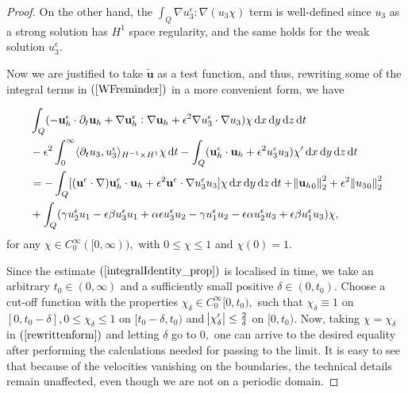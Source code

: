 \documentclass[12pt]{report}
\numberwithin{theorem}{chapter}
\numberwithin{corollary}{chapter}
\numberwithin{lemma}{chapter}
\numberwithin{remark}{chapter}
\numberwithin{definition}{chapter}
\numberwithin{prop}{chapter}
\newcommand*\diff{\mathop{}\!\mathrm{d}}
\begin{document}
\begin{proof}
On the other hand, the $ \int_Q \nabla u^\epsilon_3 : \nabla (u_3 \chi) $ term is well-defined since $u_3$ as a strong solution has $H^1$ space regularity, and the same holds for the weak solution $u^\epsilon_3.$

Now we are justified to take $\tilde{\mathbf{u}}$ as a test function, and thus, rewriting some of the integral terms in $(\ref{WFreminder})$ in a more convenient form, we have

\begin{equation} \label{rewrittenform}
  \begin{split}
    & \int_Q (- \mathbf{u}_h^\epsilon \cdot \partial_t \mathbf{u}_h + \nabla \mathbf{u}_h^\epsilon : \nabla \mathbf{u}_h + \epsilon^2 \nabla u_3^\epsilon \cdot \nabla u_3) \chi \diff x \diff y \diff z \diff t \\
    & - \epsilon^2 \int_0^\infty \langle \partial_t u_3 , u_3^\epsilon \rangle _{H^{-1} \times H^1} \chi \diff t - \int_Q (\mathbf{u}_h^\epsilon \cdot \mathbf{u}_h + \epsilon^2 u_3^\epsilon u_3) \chi' \diff x \diff y \diff z \diff t \\
    & = - \int_Q [(\mathbf{u}^\epsilon \cdot \nabla) \mathbf{u}_h^\epsilon \cdot \mathbf{u}_h + \epsilon^2 \mathbf{u}^\epsilon \cdot \nabla u_3^\epsilon u_3] \chi \diff x \diff y \diff z \diff t + \norm{{\mathbf{u}_h}_0}_2^2 + \epsilon^2 \norm{{u_3}_0}_2^2 \\
    & + \int_Q  ( \gamma u_2^\epsilon u_1 - \epsilon \beta u_3^\epsilon u_1 + \alpha \epsilon u_3^\epsilon u_2 - \gamma u_1^\epsilon u_2 - \epsilon \alpha u^\epsilon_2 u_3 + \epsilon \beta u_1^\epsilon u_3) \chi,\raisetag{80pt}
  \end{split}
\end{equation}
%
for any $\chi \in C^\infty_0 ([0,\infty)),$ with $0 \leq \chi \leq 1$ and $\chi (0) = 1.$

Since the estimate $(\ref{integralIdentity_prop})$ is localised in time, we take an arbitrary $t_0 \in (0, \infty)$ and a sufficiently small positive $\delta \in (0, t_0).$ Choose a cut-off function with the properties $\chi_\delta \in C^\infty_0 [0,t_0),$ such that $\chi_\delta \equiv 1$ on $[0, t_0 -\delta], 0 \leq \chi_\delta \leq 1$ on $[t_0 - \delta, t_0 )$ and $\abs{\chi_\delta '} \leq \frac{2}{\delta}$ on $[0, t_0).$ Now, taking $\chi = \chi_\delta$ in $(\ref{rewrittenform})$ and letting $\delta$ go to $0,$ one can arrive to the desired equality after performing the calculations needed for passing to the limit. It is easy to see that because of the velocities vanishing on the boundaries, the technical details remain unaffected, even though we are not on a periodic domain.


\end{proof}
\end{document}
